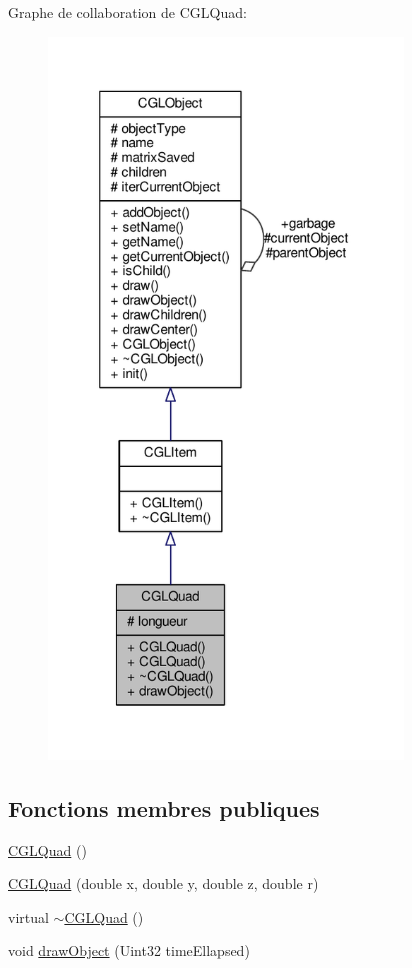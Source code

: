 Graphe de collaboration de C\-G\-L\-Quad\-:\nopagebreak
\begin{figure}[H]
\begin{center}
\leavevmode
\includegraphics[width=267pt]{dd/d46/class_c_g_l_quad__coll__graph}
\end{center}
\end{figure}
\subsection*{Fonctions membres publiques}
\begin{DoxyCompactItemize}
\item 
\hyperlink{class_c_g_l_quad_a95b07c1605f65de30cb47b65fa364294}{C\-G\-L\-Quad} ()
\item 
\hyperlink{class_c_g_l_quad_a6a78f1183a166adf08bfe3880f2cd415}{C\-G\-L\-Quad} (double x, double y, double z, double r)
\item 
virtual \hyperlink{class_c_g_l_quad_a19320cf64816de2de1fa7540acbf833e}{$\sim$\-C\-G\-L\-Quad} ()
\item 
void \hyperlink{class_c_g_l_quad_a81696d558e2355af7d621cdbf0ccf41a}{draw\-Object} (Uint32 time\-Ellapsed)
\end{DoxyCompactItemize}
